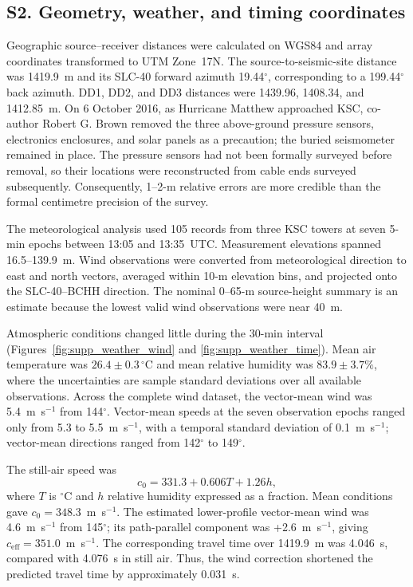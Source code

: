 \documentclass[]{seismica}
\begin{document}
\FloatBarrier
\subsection{S2. Geometry, weather, and timing coordinates}
\label{sec:supp_weather}

Geographic source--receiver distances were calculated on WGS84 and array
coordinates transformed to UTM Zone~17N. The source-to-seismic-site distance
was 1419.9~m and its SLC-40 forward azimuth 19.44$^\circ$, corresponding to a
199.44$^\circ$ back azimuth. DD1, DD2, and DD3 distances were 1439.96,
1408.34, and 1412.85~m. On 6 October 2016, as Hurricane Matthew approached
KSC, co-author Robert G. Brown removed the three above-ground pressure sensors,
electronics enclosures, and solar panels as a precaution; the buried
seismometer remained in place. The pressure sensors had not been formally
surveyed before removal, so their locations were reconstructed from cable ends
surveyed subsequently. Consequently, 1--2-m relative errors are more credible
than the formal centimetre precision of the survey.

The meteorological analysis used 105 records from three KSC towers at seven
5-min epochs between 13:05 and 13:35~UTC. Measurement elevations spanned
16.5--139.9~m. Wind observations were converted from meteorological direction
to east and north vectors, averaged within 10-m elevation bins, and projected
onto the SLC-40--BCHH direction. The nominal 0--65-m source-height summary is
an estimate because the lowest valid wind observations were near 40~m.

Atmospheric conditions changed little during the 30-min interval
(Figures~\ref{fig:supp_weather_wind} and
\ref{fig:supp_weather_time}). Mean air temperature was
$26.4\pm0.3\,^{\circ}$C and mean relative humidity was
$83.9\pm3.7\%$, where the uncertainties are sample standard deviations over
all available observations. Across the complete wind dataset, the vector-mean
wind was 5.4~m~s$^{-1}$ from 144$^\circ$. Vector-mean speeds at the seven
observation epochs ranged only from 5.3 to 5.5~m~s$^{-1}$, with a temporal
standard deviation of 0.1~m~s$^{-1}$; vector-mean directions ranged from
142$^\circ$ to 149$^\circ$.

The still-air speed was
\begin{equation}
 c_0=331.3+0.606T+1.26h,
\end{equation}
where $T$ is $^\circ$C and $h$ relative humidity expressed as a fraction. Mean
conditions gave $c_0=348.3$~m~s$^{-1}$. The estimated lower-profile
vector-mean wind was 4.6~m~s$^{-1}$ from 145$^\circ$; its path-parallel
component was +2.6~m~s$^{-1}$, giving
$c_{\mathrm{eff}}=351.0$~m~s$^{-1}$. The corresponding travel time over
1419.9~m was 4.046~s, compared with 4.076~s in still air. Thus, the wind
correction shortened the predicted travel time by approximately 0.031~s.
\end{document}
